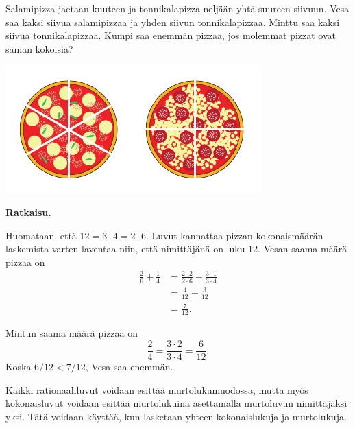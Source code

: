    \begin{esimerkki}
        Salamipizza jaetaan kuuteen ja tonnikalapizza neljään yhtä suureen
        siivuun. Vesa saa kaksi siivua salamipizzaa ja yhden siivun tonnikalapizzaa.
        Minttu saa kaksi siivua tonnikalapizzaa. Kumpi saa enemmän pizzaa, jos
        molemmat pizzat ovat saman kokoisia?
        
        \begin{center}        
          \includegraphics[scale=1.0]{pictures/Kuva3-1-6-pizzat.pdf}
        \end{center}

        \textbf{Ratkaisu.}
        
        Huomataan, että $12 = 3\cdot 4 = 2\cdot 6$. Luvut kannattaa
        pizzan kokonaismäärän laskemista varten laventaa niin, että
        nimittäjänä on luku $12$.
        Vesan saama määrä pizzaa on
        \begin{align*}
           \frac{2}{6} + \frac{1}{4} &= \frac{2\cdot 2}{2\cdot 6} + \frac{3\cdot 1}{3\cdot 4} \\ 
	       							 &= \frac{4}{12}+\frac{3}{12} \\ 
	       							 &= \frac{7}{12}.
        \end{align*}
        
        Mintun saama määrä pizzaa on
        \[
            \frac{2}{4} =
            \frac{3\cdot 2}{3\cdot 4} =
            \frac{6}{12}.
        \]
        Koska $6/12 < 7/12$, Vesa saa enemmän.
    \end{esimerkki}
    
    Kaikki rationaaliluvut voidaan esittää murtolukumuodossa, mutta myös
    kokonaisluvut voidaan esittää murtolukuina asettamalla murtoluvun
    nimittäjäksi yksi. Tätä voidaan käyttää, kun lasketaan yhteen
    kokonaislukuja ja murtolukuja.
    
